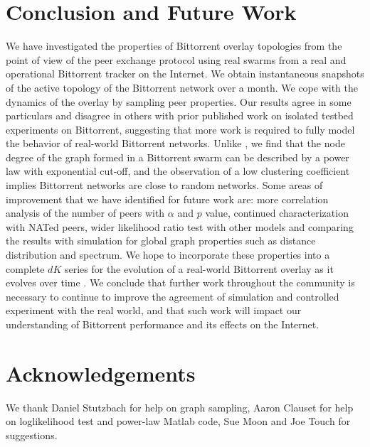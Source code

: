 \documentclass[paper]{ieice}
\begin{document}
\section{Conclusion and Future Work}\label{conclude}
We have investigated the properties of Bittorrent overlay topologies from the point of view of the peer exchange protocol using real swarms from a real and operational Bittorrent tracker on the Internet. 
We obtain instantaneous snapshots of the active topology of the Bittorrent network over a month.
We cope with the dynamics of the overlay by sampling peer properties. 
Our results agree in some particulars and disagree in others with prior published work on isolated testbed experiments on Bittorrent, suggesting that more work is required to fully model the behavior of real-world Bittorrent networks.
Unlike \cite{dale2008evolution}, we find that the node degree of the graph formed in a Bittorrent swarm can be described by a power law with exponential cut-off, and the observation of a low clustering coefficient implies Bittorrent networks are close to random networks.
Some areas of improvement that we have identified for future work are: more correlation analysis of the number of peers with $\alpha$ and $p$ value, continued characterization with NATed peers, wider likelihood ratio test with other models and comparing the results with simulation for global graph properties such as distance distribution and spectrum.
We hope to incorporate these properties into a complete $dK$ series for the evolution of a real-world Bittorrent overlay as it evolves over time \cite{mahadevan2006systematic}. 
We conclude that further work throughout the community is necessary to continue to improve the agreement of simulation and controlled experiment with the real world, and that such work will impact our understanding of Bittorrent performance and its effects on the Internet.


\section*{Acknowledgements}
We thank Daniel Stutzbach for help on graph sampling, Aaron Clauset for help on loglikelihood test and power-law Matlab code, Sue Moon and Joe Touch for suggestions.



\end{document}
